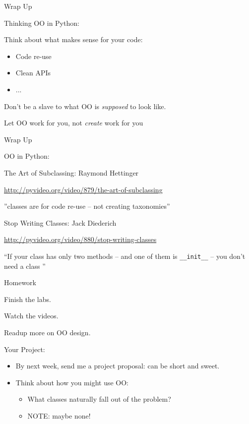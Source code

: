 \documentclass{beamer}
\begin{document}
\begin{frame}[fragile]{Wrap Up}

{\LARGE Thinking OO in Python:}

\vfill
{\large Think about what makes sense for your code:}
\begin{itemize}
  \item {\large Code re-use}
  \item {\large Clean APIs}
  \item {\large ... }
\end{itemize}

\vfill
{\large Don't be a slave to what OO is \emph{supposed} to look like. }

\vfill
{\large Let OO work for you, not \emph{create} work for you}

\end{frame}


\begin{frame}[fragile]{Wrap Up}

{\Large OO in Python:}

\vfill
{\Large The Art of Subclassing}: Raymond Hettinger

\vfill
{\small \url{http://pyvideo.org/video/879/the-art-of-subclassing}}

\vfill
''classes are for code re-use -- not creating taxonomies''

\vfill
{\Large Stop Writing Classes}: Jack Diederich

\vfill
{\small \url{http://pyvideo.org/video/880/stop-writing-classes}}

\vfill
``If your class has only two methods -- and one of them is \verb|__init__|
-- you don't need a class ''
\end{frame}

\begin{frame}[fragile]{Homework}

{\Large Finish the labs.}

\vfill
{\Large Watch the videos.}

\vfill
{\Large Readup more on OO design.}


\vfill
{\LARGE Your Project:}
\begin{itemize}
  \item By next week, send me a project proposal: can be short and sweet.
  \item Think about how you might use OO:
  \begin{itemize}
    \item What classes naturally fall out of the problem?
    \item NOTE: maybe none!
  \end{itemize}
\end{itemize}

\end{frame}
 
\end{document}
